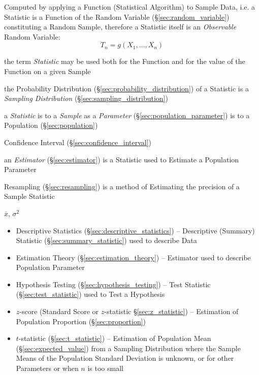 Computed by applying a Function (Statistical Algorithm) to Sample Data, i.e. a
Statistic is a Function of the Random Variable (\S\ref{sec:random_variable})
constituting a Random Sample, therefore a Statistic itself is an
\emph{Observable} Random Variable:
\[
  T_n = g(X_1, \ldots, X_n)
\]

the term \emph{Statistic} may be used both for the Function and for the value of
the Function on a given Sample

the Probability Distribution (\S\ref{sec:probability_distribution}) of a
Statistic is a \emph{Sampling Distribution} (\S\ref{sec:sampling_distribution})

a \emph{Statistic} is to a \emph{Sample} as a \emph{Parameter}
(\S\ref{sec:population_parameter}) is to a Population (\S\ref{sec:population})

Confidence Interval (\S\ref{sec:confidence_interval})

\fist an \emph{Estimator} (\S\ref{sec:estimator}) is a Statistic used to
Estimate a Population Parameter

\fist Resampling (\S\ref{sec:resampling}) is a method of Estimating the
precision of a Sample Statistic

$\overline{x}$, $\sigma^2$

\begin{itemize}
  \item Descriptive Statistics (\S\ref{sec:descriptive_statistics}) --
    Descriptive (Summary) Statistic (\S\ref{sec:summary_statistic}) used to
    describe Data
  \item Estimation Theory (\S\ref{sec:estimation_theory}) -- Estimator used to
    describe Population Parameter
  \item Hypothesis Testing (\S\ref{sec:hypothesis_testing}) -- Test Statistic
    (\S\ref{sec:test_statistic}) used to Test a Hypothesis
\end{itemize}

\asterism

\begin{itemize}
  \item $z$-score (Standard Score or $z$-statistic \S\ref{sec:z_statistic})
    -- Estimation of Population Proportion (\S\ref{sec:proportion})
  \item $t$-statistic (\S\ref{sec:t_statistic}) -- Estimation of Population Mean
    (\S\ref{sec:expected_value}) from a Sampling Distribution where the Sample
    Means of the Population Standard Deviation is unknown, or for other
    Parameters or when $n$ is too small
\end{itemize}

